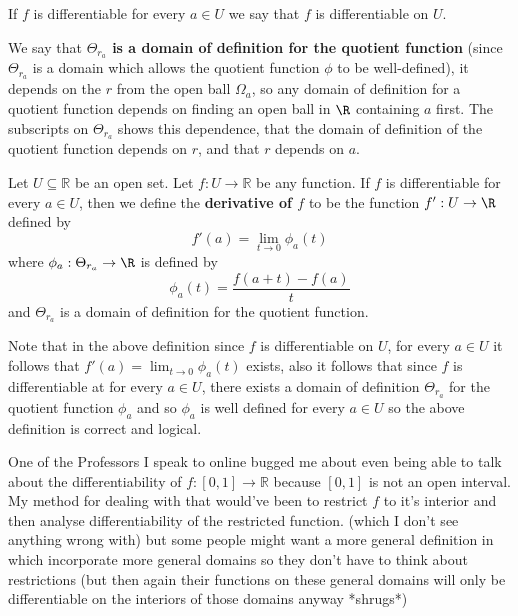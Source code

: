 	
	\begin{remark}[1]
		If $f$ is differentiable for every $a \in U$ we say that $f$ is differentiable on $U$. 
	\end{remark}
	
	
	\begin{remark}[2]
		We say that \textbf{$\Theta_{r_a}$ is a domain of definition for the quotient function} (since $\Theta_{r_a}$ is a domain which allows the quotient function $\phi$ to be well-defined), it depends on the $r$ from the open ball $\Omega_a$, so any domain of definition for a quotient function depends on finding an open ball in $\R$ containing $a$ first. The subscripts on $\Theta_{r_a}$ shows this dependence, that the domain of definition of the quotient function depends on $r$, and that $r$ depends on $a$.
	\end{remark}
	

	\begin{definition}
		Let $U \subseteq \mathbb{R}$ be an open set. Let $f : U \to \mathbb{R}$ be any function. If $f$ is differentiable for every $a \in U$, then we define the \textbf{derivative of $f$} to be the function  $f' : U \to \R$ defined by $$f'(a) = \lim_{t \to 0}\phi_{a}(t)$$ where $\phi_a : \Theta_{r_a} \to \R$ is defined by $$\phi_a(t) = \frac{f(a+t)-f(a)}{t}$$ and $\Theta_{r_a}$ is a domain of definition for the quotient function.
	\end{definition}
	
	
	\begin{remark}
		Note that in the above definition since $f$ is differentiable on $U$, for every $a \in U$ it follows that $f'(a) = \lim_{t \to 0}\phi_{a}(t)$ exists, also it follows that since $f$ is differentiable at for every $a \in U$, there exists a domain of definition $\Theta_{r_a}$ for the quotient function $\phi_a$ and so $\phi_a$ is well defined for every $a \in U$  so the above definition is correct and logical. 
	\end{remark}
	
	
\medskip
	
	One of the Professors I speak to online bugged me about even being able to talk  about the differentiability of $f : [0, 1] \to \mathbb{R}$ because $[0, 1]$ is not an open interval. My method for dealing with that would've been to restrict $f$ to it's interior and then analyse differentiability of the restricted function. (which I don't see anything wrong with) but some people might want a more general definition in which incorporate more general domains so they don't have to think about restrictions (but then again their functions on these general domains will only be differentiable on the interiors of those domains anyway *shrugs*)
	
